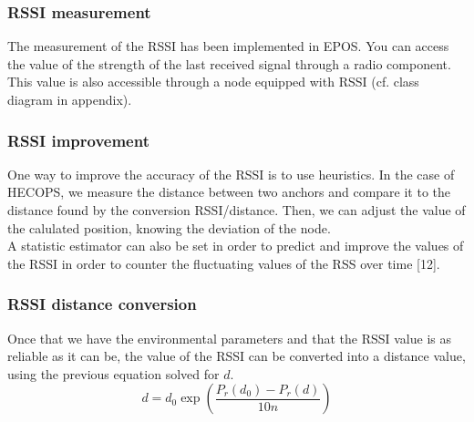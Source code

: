 \documentclass[a4paper,10pt]{article}
\begin{document}
\subsubsection{RSSI measurement}
The measurement of the RSSI has been implemented in EPOS. You can access the value of the strength of the last received signal through a radio
component. This value is also accessible through a node equipped with RSSI (cf. class diagram in appendix).

\subsubsection{RSSI improvement}
One way to improve the accuracy of the RSSI is to use heuristics. In the case of HECOPS, we measure the distance between two anchors and compare
it to the distance found by the conversion RSSI/distance. Then, we can adjust the value of the calulated position, knowing the deviation of the 
node.\\
A statistic estimator can also be set in order to predict and improve the values of the RSSI in order to counter the fluctuating values
of the RSS over time [12].

\subsubsection{RSSI distance conversion}
Once that we have the environmental parameters and that the RSSI value is as reliable as it can be, the value of the RSSI can be converted into
a distance value, using the previous equation solved for $d$. 
$$
d = d_0 \exp(\frac{P_r(d_0) - P_r(d)}{10n})
$$
\end{document}
